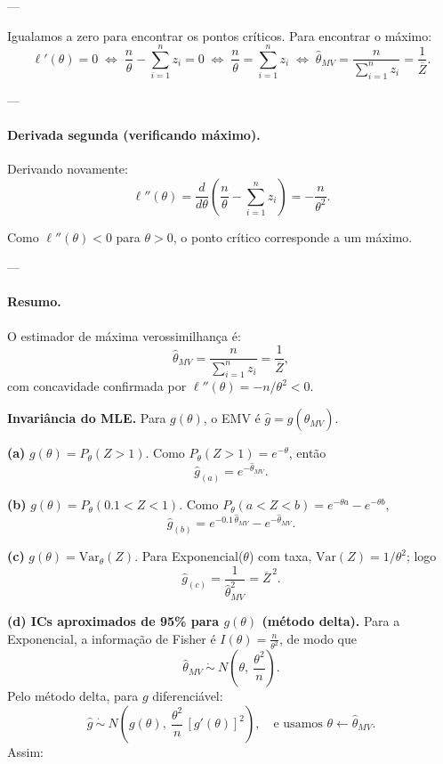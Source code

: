---

Igualamos a zero para encontrar os pontos críticos.
Para encontrar o máximo:
\[
\ell'(\theta)=0
\;\Longleftrightarrow\;
\frac{n}{\theta}-\sum_{i=1}^n z_i=0
\;\Longleftrightarrow\;
\frac{n}{\theta}=\sum_{i=1}^n z_i
\;\Longleftrightarrow\;
\widehat\theta_{MV}=\frac{n}{\sum_{i=1}^n z_i}
=\frac{1}{\overline Z}.
\]

---

\paragraph{Derivada segunda (verificando máximo).}
Derivando novamente:
\[
\ell''(\theta)
=\frac{d}{d\theta}\!\left(\frac{n}{\theta}-\sum_{i=1}^n z_i\right)
=-\frac{n}{\theta^2}.
\]

Como $\ell''(\theta)<0$ para $\theta>0$,
o ponto crítico corresponde a um máximo.

---

\paragraph{Resumo.}
O estimador de máxima verossimilhança é:
\[
\boxed{\widehat\theta_{MV}=\frac{n}{\sum_{i=1}^n z_i}
=\frac{1}{\overline Z}},
\]
com concavidade confirmada por $\ell''(\theta)=-n/\theta^2<0$.

\medskip
\textbf{Invariância do MLE.} Para $g(\theta)$, o EMV é $\widehat g=g(\widehat\theta_{MV})$.

\bigskip
\textbf{(a) } $g(\theta)=P_\theta(Z>1)$.
Como $P_\theta(Z>1)=e^{-\theta}$, então
\[
\widehat g_{(a)}=e^{-\widehat\theta_{MV}}.
\]

\medskip
\textbf{(b) } $g(\theta)=P_\theta(0.1<Z<1)$.
Como $P_\theta(a<Z<b)=e^{-\theta a}-e^{-\theta b}$,
\[
\widehat g_{(b)}=e^{-0.1\,\widehat\theta_{MV}}-e^{-\widehat\theta_{MV}}.
\]

\medskip
\textbf{(c) } $g(\theta)=\mathrm{Var}_\theta(Z)$.
Para Exponencial($\theta$) com taxa, $\mathrm{Var}(Z)=1/\theta^2$; logo
\[
\widehat g_{(c)}=\frac{1}{\widehat\theta_{MV}^2}=\overline Z^{\,2}.
\]

\bigskip
\textbf{(d) ICs aproximados de 95\% para $g(\theta)$ (método delta).}
Para a Exponencial, a informação de Fisher é $I(\theta)=\tfrac{n}{\theta^2}$,
de modo que
\[
\widehat\theta_{MV}\ \dot\sim\ N\!\left(\theta,\ \frac{\theta^2}{n}\right).
\]
Pelo método delta, para $g$ diferenciável:
\[
\widehat g\ \dot\sim\ N\!\left(g(\theta),\ \frac{\theta^2}{n}\,[g'(\theta)]^2\right),
\quad\text{e usamos } \theta\leftarrow\widehat\theta_{MV}.
\]
Assim:

